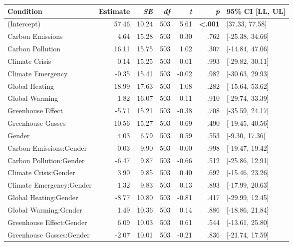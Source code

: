 \begin{table}[ht]
\centering
\begin{tabular}{lrrrrrl}
  \hline
Condition & Estimate & \textit{SE} & \textit{df} & \textit{t} & \textit{p} & 95\% CI [LL, UL] \\ 
  \hline
(Intercept) & 57.46 & 10.24 & 503 & 5.61 & \textbf{\textless  .001} & [37.33, 77.58] \\ 
  Carbon Emissions & 4.64 & 15.28 & 503 & 0.30 & .762 & [-25.38, 34.66] \\ 
  Carbon Pollution & 16.11 & 15.75 & 503 & 1.02 & .307 & [-14.84, 47.06] \\ 
  Climate Crisis & 0.14 & 15.25 & 503 & 0.01 & .993 & [-29.82, 30.11] \\ 
  Climate Emergency & -0.35 & 15.41 & 503 & -0.02 & .982 & [-30.63, 29.93] \\ 
  Global Heating & 18.99 & 17.63 & 503 & 1.08 & .282 & [-15.64, 53.62] \\ 
  Global Warming & 1.82 & 16.07 & 503 & 0.11 & .910 & [-29.74, 33.39] \\ 
  Greenhouse Effect & -5.71 & 15.21 & 503 & -0.38 & .708 & [-35.59, 24.17] \\ 
  Greenhouse Gasses & 10.56 & 15.27 & 503 & 0.69 & .490 & [-19.45, 40.56] \\ 
  Gender & 4.03 & 6.79 & 503 & 0.59 & .553 & [-9.30, 17.36] \\ 
  Carbon Emissions:Gender & -0.03 & 9.90 & 503 & -0.00 & .998 & [-19.47, 19.42] \\ 
  Carbon Pollution:Gender & -6.47 & 9.87 & 503 & -0.66 & .512 & [-25.86, 12.91] \\ 
  Climate Crisis:Gender & 3.90 & 9.85 & 503 & 0.40 & .692 & [-15.46, 23.26] \\ 
  Climate Emergency:Gender & 1.32 & 9.83 & 503 & 0.13 & .893 & [-17.99, 20.63] \\ 
  Global Heating:Gender & -8.77 & 10.80 & 503 & -0.81 & .417 & [-29.99, 12.45] \\ 
  Global Warming:Gender & 1.49 & 10.36 & 503 & 0.14 & .886 & [-18.86, 21.84] \\ 
  Greenhouse Effect:Gender & 6.09 & 10.03 & 503 & 0.61 & .544 & [-13.61, 25.80] \\ 
  Greenhouse Gasses:Gender & -2.07 & 10.01 & 503 & -0.21 & .836 & [-21.74, 17.59] \\ 
   \hline
\end{tabular}
\end{table}
